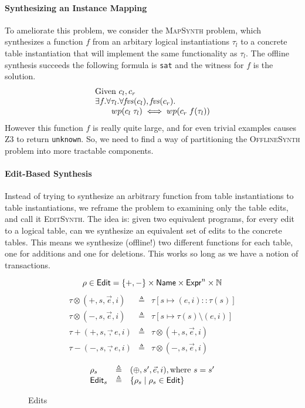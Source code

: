 \paragraph{Synthesizing an Instance Mapping} To ameliorate this problem, we consider the \textsc{MapSynth} problem, which
synthesizes a function $f$ from an arbitary logical instantiations $\tau_l$ to a
concrete table instantiation that will implement the same functionality as
$\tau_l$. The offline synthesis succeeds the following formula is \texttt{sat}
and the witness for $f$ is the solution.
\[\begin{array}{l}
    \text{Given } c_l,c_r\\
    \exists f. \forall \tau_l. \forall \mathit{fvs}(c_l), \mathit{fvs}(c_r). \\
    \qquad wp(c_l\; \tau_l) \iff wp(c_r\; f(\tau_l))
  \end{array}\]
However this function $f$ is really quite large, and for even trivial
examples causes Z3 to return \texttt{unknown}. So, we need to find a way of
partitioning the \textsc{OfflineSynth} problem into more tractable
components.

\paragraph{Edit-Based Synthesis} Instead of trying to synthesize an arbitrary
function from table instantiations to table instantiations, we reframe the
problem to examining only the table edits, and call it \textsc{EditSynth}. The
idea is: given two equivalent programs, for every edit to a logical table, can
we synthesize an equivalent set of edits to the concrete tables. This means we
synthesize (offline!) two different functions for each table, one for additions
and one for deletions. This works so long as we have a notion of transactions.



\begin{figure}[pt]
  \[\rho \in \mathsf{Edit} = \{ +, -\} \times \mathsf{Name} \times \mathsf{Expr}^n \times \mathbb N \]
  \[\begin{array}{lcl}
      \tau \otimes (+,s,\vec e, i) & \triangleq & \tau[s \mapsto (e,i)::\tau(s)] \\
      \tau \otimes (-,s,\vec e, i) & \triangleq & \tau[s \mapsto \tau(s) \setminus (e,i)] \\
      \tau + (+, s, \vec, e, i) & \triangleq & \tau \otimes (+,s, \vec e,i) \\
      \tau - (-, s, \vec, e, i) & \triangleq & \tau \otimes (-, s, \vec e, i) 
    \end{array}\]

  \[\begin{array}{lcl}
      \rho_s & \triangleq & (\oplus, s', \vec e, i), \text{where } s = s'\\
      \mathsf{Edit}_s &\triangleq & \{\rho_s \mid \rho_s\in \mathsf{Edit}\} \\
    \end{array}\]
  \caption{Edits}
  \label{fig:edits}
\end{figure}

